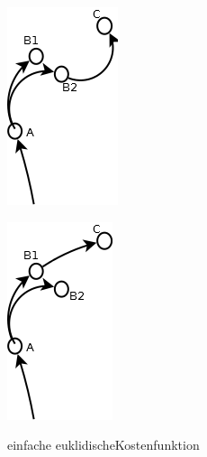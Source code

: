 \begin{figure}[htb]
  \label{fig:fig6}  
    \centering
    \begin{minipage}[t]{0.45\linewidth}
        \centering
        \includegraphics[width=.6\linewidth]{Bilder/B2Insert.png}
        \caption{einfache euklidischeKostenfunktion}
    \end{minipage}%
    \hfill
    \begin{minipage}[t]{0.45\linewidth}
\label{fig:fig9}                 
        \centering
        \includegraphics[width=.6\linewidth]{Bilder/B1Insert.png}

\end{minipage}
\end{figure}
